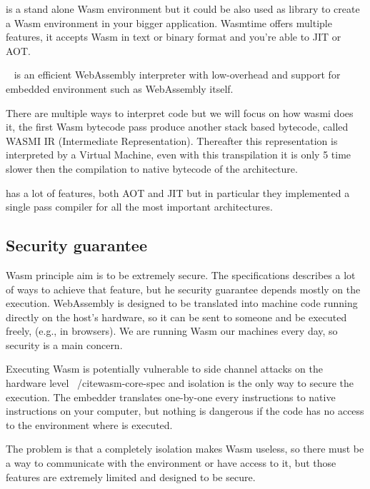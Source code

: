 \documentclass[../main.tex]{subfiles}
\begin{document}
\begin{description}[font=$\bullet$ \scshape\bfseries]
  \item[Wasmtime]
        is a stand alone Wasm environment but it could be also used as library to create a Wasm environment in your bigger application. Wasmtime offers multiple features, it accepts Wasm in text or binary format and you're able to JIT or AOT.
  \item[Wasmi]

        ~\cite{wasmi} is an efficient WebAssembly interpreter with low-overhead and support for embedded environment such as WebAssembly itself.

        There are multiple ways to interpret code but we will focus on how wasmi does it, the first Wasm bytecode pass produce another stack based bytecode, called WASMI IR (Intermediate Representation). Thereafter this representation is interpreted by a Virtual Machine, even with this transpilation it is only 5 time slower then the compilation to native bytecode of the architecture.

        \item[Wasmer] has a lot of features, both AOT and JIT but in particular they implemented a single pass compiler for all the most important architectures.
\end{description}

\subsection{Security guarantee}

Wasm principle aim is to be extremely secure. The specifications describes a lot of ways to achieve that feature, but he security guarantee depends mostly on the execution. WebAssembly is designed to be translated into machine code running directly on the host’s hardware, so it can be sent to someone and be executed freely, (e.g., in browsers). We are running Wasm our machines every day, so security is a main concern.

Executing Wasm is potentially vulnerable to side channel attacks on the hardware level ~/cite{wasm-core-spec} and isolation is the only way to secure the execution.  The embedder translates one-by-one every instructions to native instructions on your computer, but nothing is dangerous if the code has no access to the environment where is executed.

The problem is that a completely isolation makes Wasm useless, so there must be a way to communicate with the environment or  have access to it, but those features are extremely limited and designed to be secure.
\end{document}
